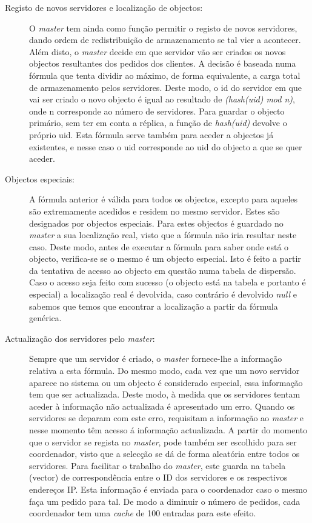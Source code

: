 \begin{description}
\item[Registo de novos servidores e localização de objectos:]
O \textit{master} tem ainda como função permitir o registo de novos servidores, dando ordem de redistribuição de armazenamento se tal vier a acontecer. Além disto, o \textit{master} decide em que servidor vão ser criados os novos objectos resultantes dos pedidos dos clientes. A decisão é baseada numa fórmula que tenta dividir ao máximo, de forma equivalente, a carga total de armazenamento pelos servidores. Deste modo, o id do servidor em que vai ser criado o novo objecto é igual ao resultado de \textit{(hash(uid) mod n)}, onde n corresponde ao número de servidores. Para guardar o objecto primário, sem ter em conta a réplica, a função de \textit{hash(uid)} devolve o próprio uid. Esta fórmula serve também para aceder a objectos já existentes, e nesse caso o uid corresponde ao uid do objecto a que se quer aceder.

\item[Objectos especiais:]
A fórmula anterior é válida para todos os objectos, excepto para aqueles são extremamente acedidos e residem no mesmo servidor. Estes são designados por objectos especiais. Para estes objectos é guardado no \textit{master} a sua localização real, visto que a fórmula não iria resultar neste caso. Deste modo, antes de executar a fórmula para saber onde está o objecto, verifica-se se o mesmo é um objecto especial. Isto é feito a partir da tentativa de acesso ao objecto em questão numa tabela de dispersão. Caso o acesso seja feito com sucesso (o objecto está na tabela e portanto é especial) a localização real é devolvida, caso contrário é devolvido \textit{null} e sabemos que temos que encontrar a localização a partir da fórmula genérica.

\item[Actualização dos servidores pelo \textit{master}:]
Sempre que um servidor é criado, o \textit{master} fornece-lhe a informação relativa a esta fórmula. Do mesmo modo, cada vez que um novo servidor aparece no sistema ou um objecto é considerado especial, essa informação tem que ser actualizada. Deste modo, à medida que os servidores tentam aceder à informação não actualizada é apresentado um erro. Quando os servidores se deparam com este erro, requisitam a informação ao \textit{master} e nesse momento têm acesso á informação actualizada.  A partir do momento que o servidor se regista no \textit{master},  pode também ser escolhido para ser coordenador, visto que a selecção se dá de forma aleatória entre todos os servidores.
Para facilitar o trabalho do \textit{master}, este guarda na tabela (vector) de correspondência entre o ID dos servidores e os respectivos endereços IP. Esta informação é enviada para o coordenador caso o mesmo faça um pedido para tal. De modo a diminuir o número de pedidos, cada coordenador tem uma \textit{cache} de 100 entradas para este efeito.


\end{description}
